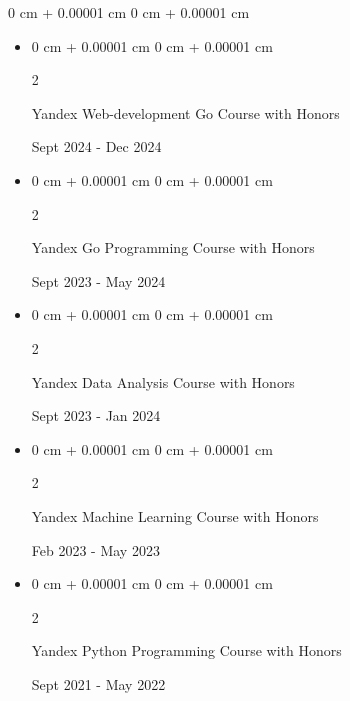\documentclass[10pt, letterpaper]{article}
\newenvironment{highlightsforbulletentries}{
    \begin{itemize}[
        topsep=0.10 cm,
        parsep=0.10 cm,
        partopsep=0pt,
        itemsep=0pt,
        leftmargin=10pt
    ]
}{
    \end{itemize}
} %
\newenvironment{onecolentry}{
    \begin{adjustwidth}{
        0 cm + 0.00001 cm
    }{
        0 cm + 0.00001 cm
    }
}{
    \end{adjustwidth}
} %
\newenvironment{twocolentry}[2][]{
    \onecolentry
    \def\secondColumn{#2}
    \setcolumnwidth{\fill, 4.5 cm}
    \begin{paracol}{2}
}{
    \switchcolumn \raggedleft \secondColumn
    \end{paracol}
    \endonecolentry
} %
\begin{document}
        \begin{onecolentry}
            \begin{highlightsforbulletentries}
                \item \begin{twocolentry}{
                    Sept 2024 - Dec 2024
                    }    
                    Yandex Web-development Go Course with Honors 
                    \end{twocolentry}
                \vspace{0.05 cm}
                \item \begin{twocolentry}{
                    Sept 2023 - May 2024
                    }    
                    Yandex Go Programming Course with Honors 
                    \end{twocolentry}
                \vspace{0.05 cm}
                \item \begin{twocolentry}{
                    Sept 2023 - Jan 2024
                    }  
                    Yandex Data Analysis Course with Honors
                    \end{twocolentry}
                \vspace{0.05 cm}
                \item \begin{twocolentry}{
                    Feb 2023 - May 2023
                    }  
                    Yandex Machine Learning Course with Honors
                    \end{twocolentry}
                \vspace{0.05 cm}
                \item \begin{twocolentry}{
                    Sept 2021 - May 2022
                    } 
                    Yandex Python Programming Course with Honors
                    \end{twocolentry}
            \end{highlightsforbulletentries}
        \end{onecolentry}
    
\end{document}
